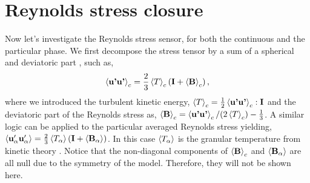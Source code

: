 \section{Reynolds stress closure}
Now let's investigate the Reynolds stress sensor, for both the continuous and the particular phase.
We first decompose the stress tensor by a sum of a spherical and deviatoric part \citep[chapter 6]{morel2015mathematical}, such as, 
\begin{equation*}
    \left<\textbf{u'u'}\right>_c
    = \frac{2}{3}\left<T\right>_c\left(
        \textbf{I}
        + \left<\textbf{B}\right>_c
    \right),
\end{equation*}
where we introduced the turbulent kinetic energy, $\left<T\right>_c = \frac{1}{2}\left<\textbf{u'u'}\right>_c:\textbf{I}$ and the deviatoric part of the Reynolds stress as, 
$\left<\textbf{B}\right>_c = \left<\textbf{u'u'}\right>_c/(2\left<T\right>_c) - \frac{1}{3}$.
A similar logic can be applied to the particular averaged Reynolds stress yielding, 
$
\left<\textbf{u}'_\alpha \textbf{u}_\alpha'\right>
    = \frac{2}{3}\left<T_\alpha\right>\left(
        \textbf{I}
        + \left<\textbf{B}_\alpha\right>
    \right)
$.
In this case $\left<T_\alpha\right>$ is the granular temperature from kinetic theory \citep{rao2008introduction}. 
Notice that the non-diagonal components of $\left<\textbf{B}\right>_c$ and  $\left<\textbf{B}_\alpha\right>$ are all null due to the symmetry of the model. 
Therefore, they will not be shown here. 
